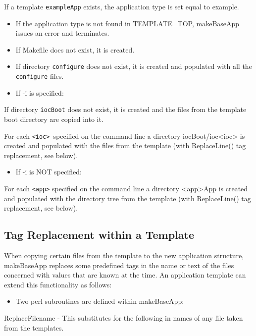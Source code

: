 If a template \verb|exampleApp| exists, the application type is set equal to example.

\begin{itemize}\item If the application type is not found in TEMPLATE\_TOP, makeBaseApp issues an error and terminates.

\item If Makefile does not exist, it is created.

\item If directory \verb|configure| does not exist, it is created and populated with all the \verb|configure| files.

\item If -i is specified:

\end{itemize}If directory \verb|iocBoot| does not exist, it is created and the files from the template boot directory are copied 
into it.

For each \verb|<ioc> |specified on the command line a directory iocBoot/ioc\textless{}ioc\textgreater{} is created and populated with 
the files from the template (with ReplaceLine() tag replacement, see below).

\begin{itemize}\item If -i is NOT specified:

\end{itemize}For each \verb|<app>| specified on the command line a directory \textless{}app\textgreater{}App is created and populated with the 
directory tree from the template (with ReplaceLine() tag replacement, see below).

\subsection{Tag Replacement within a Template}

When copying certain files from the template to the new application structure, makeBaseApp replaces some predefined 
tags in the name or text of the files concerned with values that are known at the time. An application template can extend 
this functionality as follows:

\begin{itemize}\item Two perl subroutines are defined within makeBaseApp:

\end{itemize}ReplaceFilename - This substitutes for the following in names of any file taken from the templates.                 

